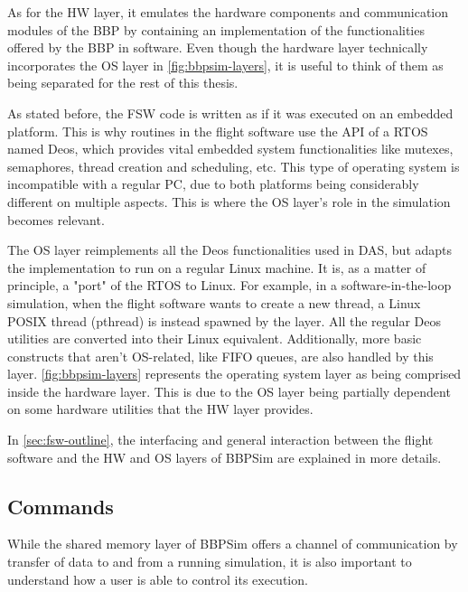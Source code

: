 {As for the HW layer, it emulates the hardware components and communication modules of the BBP by containing an implementation of the functionalities offered by the BBP in software. Even though the hardware layer technically incorporates the OS layer in \autoref{fig:bbpsim-layers}, it is useful to think of them as being separated for the rest of this thesis.

As stated before, the FSW code is written as if it was executed on an embedded platform. This is why routines in the flight software use the API of a \gls{RTOS} named Deos, which provides vital embedded system functionalities like mutexes, semaphores, thread creation and scheduling, etc. This type of operating system is incompatible with a regular PC, due to both platforms being considerably different on multiple aspects. This is where the OS layer's role in the simulation becomes relevant. 

The OS layer reimplements all the Deos functionalities used in DAS, but adapts the implementation to run on a regular Linux machine. It is, as a matter of principle, a "port" of the RTOS to Linux. For example, in a software-in-the-loop simulation, when the flight software wants to create a new thread, a Linux POSIX thread (pthread) is instead spawned by the layer. All the regular Deos utilities are converted into their Linux equivalent. Additionally, more basic constructs that aren't OS-related, like FIFO queues, are also handled by this layer. \autoref{fig:bbpsim-layers} represents the operating system layer as being comprised inside the hardware layer. This is due to the OS layer being partially dependent on some hardware utilities that the HW layer provides.

In \autoref{sec:fsw-outline}, the interfacing and general interaction between the flight software and the HW and OS layers of BBPSim are explained in more details.

\subsection*{Commands}
While the shared memory layer of BBPSim offers a channel of communication by transfer of data to and from a running simulation, it is also important to understand how a user is able to control its execution. 

}
